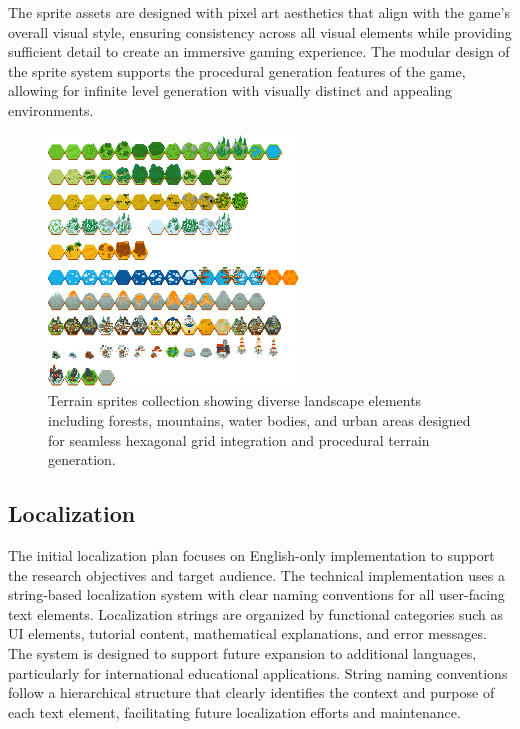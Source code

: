 \documentclass[english]{tudscrreprt}
\begin{document}
The sprite assets are designed with pixel art aesthetics that align with the game's overall visual style, ensuring consistency across all visual elements while providing sufficient detail to create an immersive gaming experience. The modular design of the sprite system supports the procedural generation features of the game, allowing for infinite level generation with visually distinct and appealing environments.

\begin{figure}[h]
\centering
\includegraphics[width=0.6\textwidth]{figures/tileset-borderless.png}
\caption{Terrain sprites collection showing diverse landscape elements including forests, mountains, water bodies, and urban areas designed for seamless hexagonal grid integration and procedural terrain generation.}
\label{fig:tileset_borderless}
\end{figure}

\subsection{Localization}
The initial localization plan focuses on English-only implementation to support the research objectives and target audience. The technical implementation uses a string-based localization system with clear naming conventions for all user-facing text elements. Localization strings are organized by functional categories such as UI elements, tutorial content, mathematical explanations, and error messages. The system is designed to support future expansion to additional languages, particularly for international educational applications. String naming conventions follow a hierarchical structure that clearly identifies the context and purpose of each text element, facilitating future localization efforts and maintenance.
\end{document}
